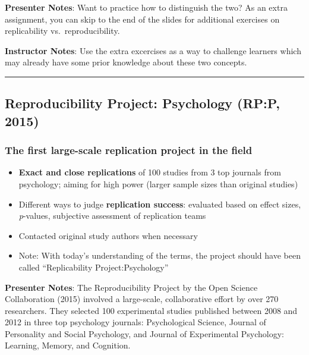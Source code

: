 \documentclass[
  english,
  letterpaper,
  DIV=11,
  numbers=noendperiod]{scrartcl}
\providecommand{\tightlist}{%
  \setlength{\itemsep}{0pt}\setlength{\parskip}{0pt}}
\begin{document}
\textbf{Presenter Notes}: Want to practice how to distinguish the two?
As an extra assignment, you can skip to the end of the slides for
additional exercises on replicability vs.~reproducibility.

\textbf{Instructor Notes}: Use the extra excercises as a way to
challenge learners which may already have some prior knowledge about
these two concepts.

\begin{center}\rule{0.5\linewidth}{0.5pt}\end{center}

\subsection{Reproducibility Project: Psychology (RP:P,
2015)}\label{reproducibility-project-psychology-rpp-2015}

\subsubsection{The first large-scale replication project in the
field}\label{the-first-large-scale-replication-project-in-the-field}

\begin{itemize}
\tightlist
\item
  \textbf{Exact and close replications} of 100 studies from 3 top
  journals from psychology; aiming for high power (larger sample sizes
  than original studies)
\item
  Different ways to judge \textbf{replication success}: evaluated based
  on effect sizes, \emph{p}-values, subjective assessment of replication
  teams
\item
  Contacted original study authors when necessary
\item
  {Note: With today's understanding of the terms, the project should
  have been called ``Replicability Project:Psychology''}
\end{itemize}

\textbf{Presenter Notes}: The Reproducibility Project by the Open
Science Collaboration (2015) involved a large-scale, collaborative
effort by over 270 researchers. They selected 100 experimental studies
published between 2008 and 2012 in three top psychology journals:
Psychological Science, Journal of Personality and Social Psychology, and
Journal of Experimental Psychology: Learning, Memory, and Cognition.
\end{document}
